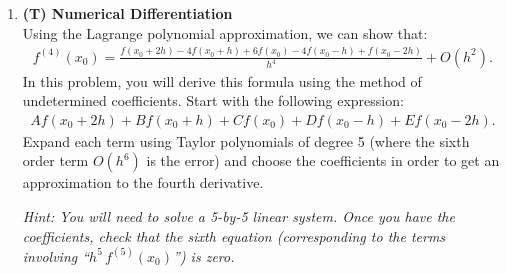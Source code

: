 \documentclass[12pt]{article}
\begin{document}
\begin{enumerate}[label=\bfseries Problem \arabic*:]






 
\item \textbf{(T) Numerical Differentiation}\\
Using the Lagrange polynomial approximation, we can show that:
\begin{align*}
f^{(4)}(x_0)= \frac{f(x_0+2h)-4f(x_0+h)+6f(x_0)-4f(x_0-h)+f(x_0-2h)}{h^4} +{O}(h^2).
\end{align*}
In this problem, you will derive this formula using the method of undetermined coefficients. Start with the following expression:
\begin{align*}
Af(x_0+2h)+Bf(x_0+h)+Cf(x_0)+Df(x_0-h)+Ef(x_0-2h).
\end{align*}
Expand each term using Taylor polynomials of degree 5 (where the sixth order term ${O}(h^6)$ is the error) and choose the coefficients in order to get an approximation to the fourth derivative. 

\textit{Hint: You will need to solve a 5-by-5 linear system. Once you have the coefficients, check that the sixth equation (corresponding to the terms involving ``$h^5\,f^{(5)}(x_0)$'') is zero. }



\end{enumerate}
\end{document}

